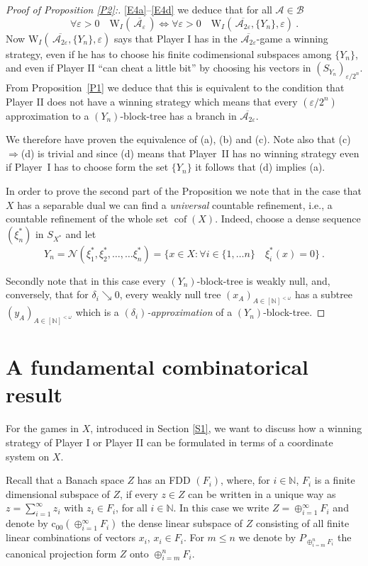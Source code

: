 \documentclass[11pt,leqno]{amsart}
\theoremstyle{definition}
\newcommand{\n}{\noindent}
\newcommand{\vp}{\varepsilon}
\newcommand{\coo}{\mbox{c}_{00}}
\newcommand{\cof}{\operatorname{cof}}
\newcommand{\cA}{\mathcal{A}}
\newcommand{\cB}{\mathcal{B}}
\newcommand{\cN}{\mathcal{N}}
\newcommand{\bcAvp}{\overline{\mathcal{A_\vp}}}
\newcommand{\N}{\mathbb{N}}
\newcommand{\fN}{[\N]^{<\omega}}
\begin{document}
\begin{proof}[Proof of Proposition \ref{P2}:]
\n {From} \eqref{E4a}--\eqref{E4d}
we deduce that for all $\cA\in\cB$
$$\forall \vp>0\quad \text{W}_I(\,\bcAvp\,)\iff\forall\vp>0\quad 
\text{W}_I(\,\overline{\cA_{2\vp}},\{Y_n\},\vp)\ .$$
Now $\text{W}_I(\,\overline{\cA_{2\vp}},\{Y_n\},\vp)$ says 
that Player I has in the 
$\overline{\cA_{2\vp}} $-game a winning strategy,
even if he has to choose his finite codimensional subspaces among $\{Y_n\}$,
and even if Player II ``can cheat a little bit'' by choosing his vectors 
in $(S_{Y_n})_{\vp/2^n}$.
{From} Proposition~\ref{P1} we deduce that this is equivalent 
to the condition that 
Player II does not have a winning strategy which means that every 
$(\vp/2^n)$ approximation to a
$(Y_n)$-block-tree has a branch in $\overline{\cA_{2\vp}}$.
       
We therefore have proven the equivalence of (a), (b) and (c). 
Note also that (c)$\Rightarrow$(d) is trivial and
since (d) means that Player~II has no winning strategy even if Player~I 
has to choose form the set $\{Y_n\}$ it follows that (d) implies (a). 
      
In order to prove the second part of the Proposition we note that in the case
that $X$ has a separable dual we can find a {\em universal\/} 
countable refinement, i.e., a countable refinement of the whole set $\cof(X)$. 
Indeed, choose a dense sequence $(\xi^*_n)$ in $S_{X^*}$ and let 
$$Y_n=\cN(\xi^*_1, \xi^*_2,\ldots , \ldots\xi^*_n)
=\{x\in X:\forall i\in\{1,\ldots n\}\quad\xi^*_i(x)=0\}\ .$$
       
Secondly note that in this case every $(Y_n)$-block-tree is weakly null, 
and, conversely, that for $\delta_i\searrow 0$, every weakly null tree 
$(x_A)_{A\in\fN}$ has a subtree $(y_A)_{A\in\fN}$ which
is a  {\em$(\delta_i)$-approximation\/} of a  
$(Y_n)$-block-tree.
\end{proof}
      
\section{A fundamental combinatorical result}\label{S2}
 
For the games in $X$, introduced in Section \ref{S1}, we want 
to discuss how a winning strategy of Player I or Player II can be
formulated in terms of a coordinate system on $X$.
 
Recall that a Banach space $Z$ has an FDD $(F_i)$, where, 
for $i\in\N$, $F_i$ is a finite dimensional
subspace of $Z$, if every $z\in Z$  can be written in a unique way as
$z=\sum_{i=1}^\infty z_i$ with $z_i\in F_i$, for all $i\in\N$.
In this case we write $Z=\oplus_{i=1}^\infty F_i$ and denote by 
$\coo(\oplus_{i=1}^\infty F_i)$
the dense linear subspace of $Z$ consisting of all 
finite linear combinations of vectors $x_i$, $x_i\in F_i$.
For $m\le n$   we denote by $P_{\oplus_{i=m}^n F_i}$  
the canonical projection form $Z$ onto $\oplus_{i=m}^n F_i$.
    
\end{document}
